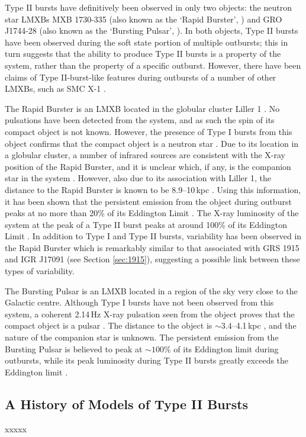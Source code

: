 \par Type II bursts have definitively been observed in only two objects: the neutron star LMXBs MXB 1730-335 (also known as the `Rapid Burster', \citealp{Lewin_TypeII}) and GRO J1744-28 (also known as the `Bursting Pulsar', \citealp{Paciesas_BPDiscovery}).  In both objects, Type II bursts have been observed during the soft state portion of multiple outbursts; this in turn suggests that the ability to produce Type II bursts is a property of the system, rather than the property of a specific outburst.  However, there have been claims of Type II-burst-like features during outbursts of a number of other LMXBs, such as SMC X-1 \citep{Angelini_SMC}.
\par The Rapid Burster is an LMXB located in the globular cluster Liller 1 \citep{Lewin_TypeII}.  No pulsations have been detected from the system, and as such the spin of its compact object is not known.  However, the presence of Type I bursts from this object confirms that the compact object is a neutron star \citep{Hoffman_RB}.  Due to its location in a globular cluster, a number of infrared sources are consistent with the X-ray position of the Rapid Burster, and it is unclear which, if any, is the companion star in the system \citep{Homer_RBNoSec}.  However, also due to its association with Liller 1, the distance to the Rapid Burster is known to be 8.9--10\,kpc \citep{Ortolani_LillerD}.  Using this information, it has been shown that the persistent emission from the object during outburst peaks at no more than 20\% of its Eddington Limit \citep{Bagnoli_RB}.  The X-ray luminosity of the system at the peak of a Type II burst peaks at around 100\% of its Eddington Limit \citep{Tan_RBBursts,Bagnoli_PopStudy}.  In addition to Type I and Type II bursts, variability has been observed in the Rapid Burster which is remarkably similar to that associated with GRS 1915 and IGR J17091 (see Section \ref{sec:1915}), suggesting a possible link between these types of variability.
\par The Bursting Pulsar is an LMXB located in a region of the sky very close to the Galactic centre.  Although Type I bursts have not been observed from this system, a coherent 2.14\,Hz X-ray pulsation seen from the object proves that the compact object is a pulsar \citep{Kouveliotou_BPPulse}.  The distance to the object is $\sim3.4$--4.1\,kpc \citep{Sanna_BP}, and the nature of the companion star is unknown.  The persistent emission from the Bursting Pulsar is believed to peak at $\sim100$\% of its Eddington limit during outbursts, while its peak luminosity during Type II bursts greatly exceeds the Eddington limit \citep{Sturner_BPNature}.

\subsection{A History of Models of Type II Bursts}

xxxxx